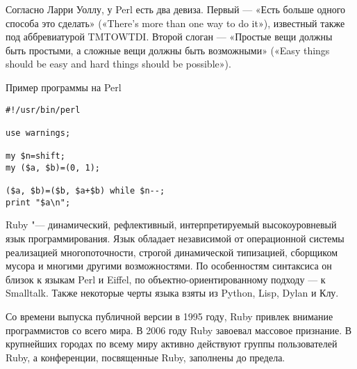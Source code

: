 \documentclass[14pt]{beamer}
\begin{document}
\begin{frame}
\begin{block}

Согласно Ларри Уоллу, у Perl есть два девиза. Первый — «Есть больше одного способа это сделать» («There’s more than one way to do it»), известный также под аббревиатурой TMTOWTDI. Второй слоган — «Простые вещи должны быть простыми, а сложные вещи должны быть возможными» («Easy things should be easy and hard things should be possible»).
\end{block}
\end{frame}

\begin{frame}[fragile]
\begin{block}{Пример программы на Perl}

\begin{lstlisting}
#!/usr/bin/perl

use warnings;

my $n=shift;
my ($a, $b)=(0, 1);

($a, $b)=($b, $a+$b) while $n--;
print "$a\n";
\end{lstlisting}
\end{block}

\begin{center}
\hyperlink{menu}{}
\end{center}
\end{frame}


\begin{frame}[label=Ruby]
\begin{block}{Ruby "---}
динамический, рефлективный, интерпретируемый высокоуровневый язык программирования. Язык обладает независимой от операционной системы реализацией многопоточности, строгой динамической типизацией, сборщиком мусора и многими другими возможностями. По особенностям синтаксиса он близок к языкам Perl и Eiffel, по объектно-ориентированному подходу — к Smalltalk. Также некоторые черты языка взяты из Python, Lisp, Dylan и Клу.
\end{block}
\end{frame}



\begin{frame}
\begin{block}

Со времени выпуска публичной версии в 1995 году, Ruby привлек внимание программистов со всего мира. В 2006 году Ruby завоевал массовое признание. В крупнейших городах по всему миру активно действуют группы пользователей Ruby, а конференции, посвященные Ruby, заполнены до предела.
\end{block}
\end{frame}
\end{document}

